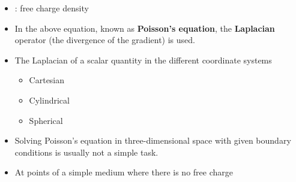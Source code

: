 \begin{ELunit}

\begin{itemize}
\item
  \ELim{\rho}: free charge density
\item
  In the above equation, known as \textbf{Poisson's equation}, the \textbf{Laplacian} operator (the divergence of the gradient) is used.
\item
  The Laplacian of a scalar quantity in the different coordinate systems

  \begin{itemize}
  \tightlist
  \item
    Cartesian
  \item
    Cylindrical
  \item
    Spherical
  \end{itemize}
\item
  Solving Poisson's equation in three-dimensional space with given boundary conditions is usually not a simple task.
\item
  At points of a simple medium where there is no free charge
\end{itemize}

\end{ELunit}

\begin{ELimportant}{}


\end{ELimportant}


